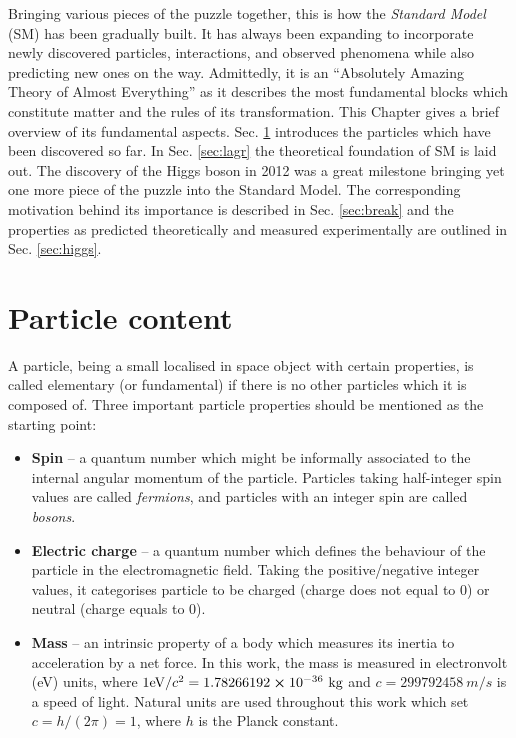 Bringing various pieces of the puzzle together, this is how the \textit{Standard Model} (SM) has been gradually built. It has always been expanding to incorporate newly discovered particles, interactions, and observed phenomena while also predicting new ones on the way. Admittedly, it is an \enquote{Absolutely Amazing Theory of Almost Everything} \cite{Mulders:2019vhb} as it describes the most fundamental blocks which constitute matter and the rules of its transformation. This Chapter gives a brief overview of its fundamental aspects. Sec. \ref{sec:particles} introduces the particles which have been discovered so far. In Sec. \ref{sec:lagr} the theoretical foundation of SM is laid out. The discovery of the Higgs boson in 2012 \cite{ATLAS:2012yve,CMS:2012qbp} was a great milestone bringing yet one more piece of the puzzle into the Standard Model. The corresponding motivation behind its importance is described in Sec. \ref{sec:break} and the properties as predicted theoretically and measured experimentally are outlined in Sec. \ref{sec:higgs}.

\section{Particle content}\label{sec:particles}

A particle, being a small localised in space object with certain properties, is called elementary (or fundamental) if there is no other particles which it is composed of. Three important particle properties should be mentioned as the starting point:
\begin{itemize}
    \item \textbf{Spin} -- a quantum number which might be informally associated to the internal angular momentum of the particle. Particles taking half-integer spin values are called \textit{fermions}, and particles with an integer spin are called \textit{bosons}.
    
    \item \textbf{Electric charge} -- a quantum number which defines the behaviour of the particle in the electromagnetic field. Taking the positive/negative integer values, it categorises particle to be charged (charge does not equal to 0) or neutral (charge equals to 0).
    
    \item \textbf{Mass} -- an intrinsic property of a body which measures its inertia to acceleration by a net force. In this work, the mass is measured in electronvolt (eV) units, where $1 \text{eV}/c^2 = 1.78266192 \cross 10^{-36} ~\text{kg}$ and $c = 299 792 458 ~m/s$ is a speed of light. Natural units are used throughout this work which set $c = h/(2\pi) = 1$, where $h$ is the Planck constant.  
\end{itemize}

